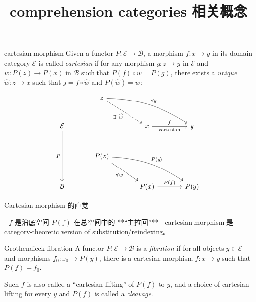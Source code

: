\documentclass{beamer}
\title{comprehension categories 相关概念}
\date{}
\begin{document}
\begin{frame}
    \titlepage
\end{frame}

\begin{frame}[fragile]{cartesian morphism\cite{ncatlab_grothendieck_fibration}}
Given a functor $P \colon \mathcal{E} \to \mathcal{B}$, a morphism $f \colon x \to y$ in its domain category $\mathcal{E}$ is called \textit{cartesian} if for any morphism $g \colon z \to y$ in $\mathcal{E}$ and $w \colon P(z) \to P(x)$ in $\mathcal{B}$ such that $P(f) \circ w = P(g)$, there exists a \textit{unique} $\widehat{w} \colon z \to x$ such that $g = f \circ \widehat{w}$ and $P(\widehat{w}) = w$:

$$
\begin{tikzcd}[row sep=large, column sep=large]
 & z \arrow[dr, dashed, "\exists! \, \widehat{w}"'] \arrow[drr, bend left=15, "\forall g"] & & \\
\mathcal{E} \arrow[dd, "P"'] & & x \arrow[r, "f", "\text{cartesian}"'] & y \\
 & P(z) \arrow[dr, "\forall w"'] \arrow[drr, bend left=15, "P(g)"] & & \\
\mathcal{B} & & P(x) \arrow[r, "P(f)"] & P(y)
\end{tikzcd}
$$
\end{frame}

\begin{frame}[fragile]{Cartesian morphism 的直觉}
\begin{markdown}
- $f$ 是沿底空间 $P(f)$ 在总空间中的 **“主拉回”**
- cartesian morphism 是 category-theoretic version of substitution/reindexing。
\end{markdown}
\end{frame}

\begin{frame}{Grothendieck fibration}
A functor $P \colon \mathcal{E} \to \mathcal{B}$ is a \textit{fibration} if for all objects $y \in \mathcal{E}$ and morphisms $f_0 \colon x_0 \to P(y)$, there is a cartesian morphism $f \colon x \to y$ such that $P(f) = f_0$.

Such $f$ is also called a ``cartesian lifting'' of $P(f)$ to $y$, and a choice of cartesian lifting for every $y$ and $P(f)$ is called a \textit{cleavage}.
\end{frame}
\end{document}
